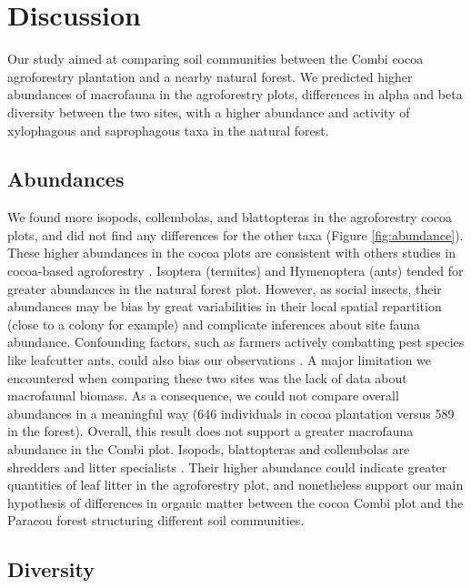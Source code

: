 \documentclass[fleqn,10pt]{ArtEcoFoG} %
\begin{document}
\section{Discussion}\label{discussion}

Our study aimed at comparing soil communities between the Combi cocoa agroforestry plantation and a nearby natural forest. We predicted higher abundances of macrofauna in the agroforestry plots, differences in alpha and beta diversity between the two sites, with a higher abundance and activity of xylophagous and saprophagous taxa in the natural forest.

\subsection{Abundances}\label{abundances}

We found more isopods, collembolas, and blattopteras in the agroforestry cocoa plots, and did not find any differences for the other taxa (Figure \ref{fig:abundance}). These higher abundances in the cocoa plots are consistent with others studies in cocoa-based agroforestry \citep{da_silva_moco_soil_2009, rousseau_shade_2021}. Isoptera (termites) and Hymenoptera (ants) tended for greater abundances in the natural forest plot. However, as social insects, their abundances may be bias by great variabilities in their local spatial repartition (close to a colony for example) and complicate inferences about site fauna abundance. Confounding factors, such as farmers actively combatting pest species like leafcutter ants, could also bias our observations \citep{saj_projetc2g2_2023}. A major limitation we encountered when comparing these two sites was the lack of data about macrofaunal biomass. As a consequence, we could not compare overall abundances in a meaningful way (646 individuals in cocoa plantation versus 589 in the forest). Overall, this result does not support a greater macrofauna abundance in the Combi plot. Isopods, blattopteras and collembolas are shredders and litter specialists \citep{da_silva_moco_soil_2009, levings_litter_1985, packham_functional_1992}. Their higher abundance could indicate greater quantities of leaf litter in the agroforestry plot, and nonetheless support our main hypothesis of differences in organic matter between the cocoa Combi plot and the Paracou forest structuring different soil communities.

\subsection{Diversity}\label{diversity}
\end{document}
